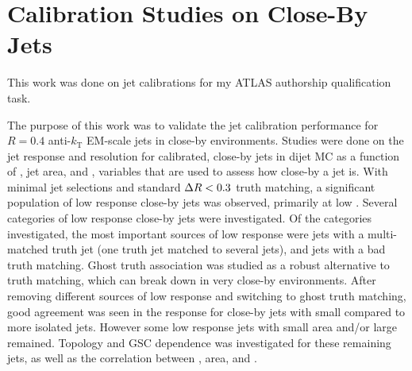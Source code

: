 \clearpage

\section{Calibration Studies on Close-By Jets}
This work was done on jet calibrations for my ATLAS authorship qualification task. 

The purpose of this work was to validate the jet calibration performance for $R = 0.4$ anti-$k_\text{T}$ EM-scale jets in close-by environments. Studies were done on the jet response and resolution for calibrated, close-by jets in  dijet MC as a function of \DeltaRmin, jet area, and \fCloseby, variables that are used to assess how close-by a jet is. With minimal jet selections and standard $\Delta R < 0.3$ truth matching, a significant population of low response close-by jets was observed, primarily at low \pt. Several categories of low response close-by jets were investigated. Of the categories investigated, the most important sources of low response were jets with a multi-matched truth jet (one truth jet matched to several jets), and jets with a bad truth matching. Ghost truth association was studied as a robust alternative to \DeltaR truth matching, which can break down in very close-by environments. After removing different sources of low response and switching to ghost truth matching, good agreement was seen in the response for close-by jets with small \DeltaRmin compared to more isolated jets. However some low response jets with small area and/or large \fCloseby remained. Topology and GSC dependence was investigated for these remaining jets, as well as the correlation between \DeltaRmin, area, and \fCloseby.